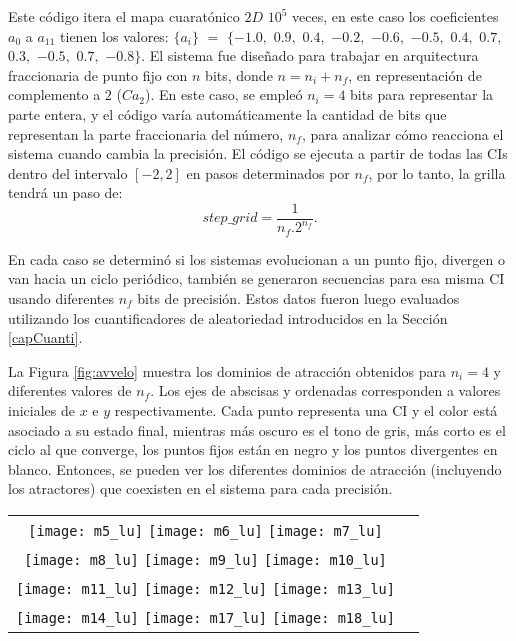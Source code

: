 Este código itera el mapa cuaratónico $2D$ $10 ^ 5$ veces, en este caso los coeficientes $a_0$ a $a_ {11}$ tienen los valores: $\{a_i \}$ $=$ $\{- 1.0,$ $0.9,$ $0.4,$ $-0.2,$ $-0.6,$ $-0.5,$ $0.4,$ $0.7,$ $0.3,$ $-0.5,$ $0.7,$ $-0.8 \}$.
El sistema fue diseñado para trabajar en arquitectura fraccionaria de punto fijo con $n$ bits, donde $n = n_i + n_f$, en representación de complemento a $2$ ($Ca_2$).
En este caso, se empleó $n_i = 4$ bits para representar la parte entera, y el código varía automáticamente la cantidad de bits que representan la parte fraccionaria del número, $n_f$, para analizar cómo reacciona el sistema cuando cambia la precisión.
El código se ejecuta a partir de todas las CIs dentro del intervalo $[-2,2]$ en pasos determinados por $n_f$, por lo tanto, la grilla tendrá un paso de:
%
\begin{equation}
step\_grid=\frac{1}{n_f.2^{n_f}}.
\end{equation}

En cada caso se determinó si los sistemas evolucionan a un punto fijo, divergen o van hacia un ciclo periódico, también se generaron secuencias para esa misma CI usando diferentes $n_f$ bits de precisión.
Estos datos fueron luego evaluados utilizando los cuantificadores de aleatoriedad introducidos en la Sección \ref{capCuanti}.

La Figura \ref{fig:avvelo} muestra los dominios de atracción obtenidos para $n_i = 4$ y diferentes valores de $n_f$.
Los ejes de abscisas y ordenadas corresponden a valores iniciales de $x$ e $y$ respectivamente.
Cada punto representa una CI y el color está asociado a su estado final, mientras más oscuro es el tono de gris, más corto es el ciclo al que converge, los puntos fijos están en negro y los puntos divergentes en blanco.
Entonces, se pueden ver los diferentes dominios de atracción (incluyendo los atractores) que coexisten en el sistema para cada precisión.
%
\begin{figure*}
	\centering
	\begin{tabular}{cc}
		\texttt{[image: m5\_lu]}
		\texttt{[image: m6\_lu]}
		\texttt{[image: m7\_lu]}\\
		\texttt{[image: m8\_lu]}
		\texttt{[image: m9\_lu]}
		\texttt{[image: m10\_lu]}\\
		\texttt{[image: m11\_lu]}
		\texttt{[image: m12\_lu]}
		\texttt{[image: m13\_lu]}\\
		\texttt{[image: m14\_lu]}
		\texttt{[image: m17\_lu]}
		\texttt{[image: m18\_lu]}\\
	\end{tabular}
	\caption{Áreas coexistentes en el dominio de atracción para: (a) $n_f=5$, (b) $n_f=6$, (c) $n_f=7$, (d) $n_f=8$, (e) $n_f=9$, (f) $n_f=10$, (g) $n_f=11$, (h) $n_f=12$, (i) $n_f=13$, (j) $n_f=14$, (k) $n_f=17$, (l) $n_f=18$.}
	\label{fig:avvelo}
\end{figure*}

